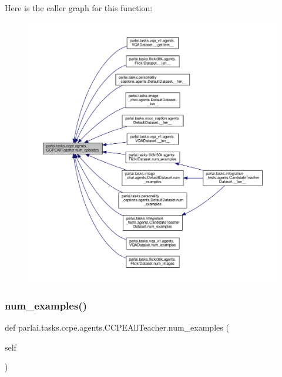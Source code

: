 Here is the caller graph for this function\+:
\nopagebreak
\begin{figure}[H]
\begin{center}
\leavevmode
\includegraphics[width=350pt]{classparlai_1_1tasks_1_1ccpe_1_1agents_1_1CCPEAllTeacher_a0f9ed996020d75cb7e204f72465f46d6_icgraph}
\end{center}
\end{figure}
\mbox{\label{classparlai_1_1tasks_1_1ccpe_1_1agents_1_1CCPEAllTeacher_aa0cd16c6ebf2fa6bc0c8ad2e449445de}} 
\subsubsection{\texorpdfstring{num\+\_\+examples()}{num\_examples()}}
{\footnotesize\ttfamily def parlai.\+tasks.\+ccpe.\+agents.\+C\+C\+P\+E\+All\+Teacher.\+num\+\_\+examples (\begin{DoxyParamCaption}\item[{}]{self }\end{DoxyParamCaption})}



